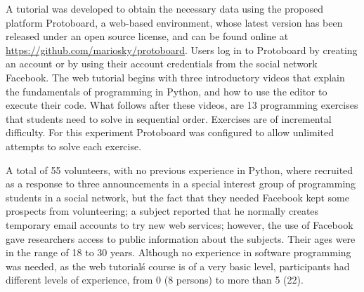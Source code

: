 \documentclass[a4paper,twoside]{article}
\begin{document}
A tutorial was developed to
obtain the necessary data using the proposed platform Protoboard, a web-based environment,
whose latest version has been released under an open source license,
and can be found online at \url{https://github.com/mariosky/protoboard}.
Users log in to 
Protoboard  by creating an account or by using their account credentials from the
social network Facebook. The web tutorial begins with three introductory videos that explain
the fundamentals of programming in Python, and how to use the editor to
execute their code. What follows after these videos, are 13 programming
exercises that students need to solve in sequential order. Exercises are of
incremental difficulty.
For this experiment Protoboard was configured to allow unlimited
attempts to solve each exercise. 

A total of 55 volunteers, with no previous experience in Python, where recruited
as a response to three announcements in a special interest group of programming
students in a social network, but the fact that they needed Facebook kept some prospects from
volunteering; a subject reported that he normally creates temporary email
accounts to try new web services; however, the use of Facebook gave researchers access to public
information about the subjects. Their ages were in the range of 18 to
30 years. Although no experience in software programming was needed, as the
web tutorial\'s course is of a very basic level, participants had
different levels of experience, from 0 (8 persons) to more than 5 (22).

\end{document}
